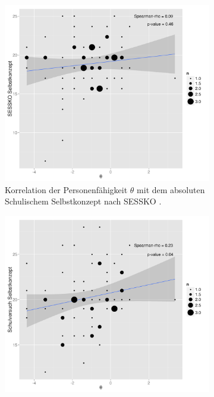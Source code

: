   \begin{figure}[htbp]
  \ContinuedFloat %
  \centering
  \begin{subfigure}{0.49\textwidth}
   \includegraphics[width=1.0\linewidth]{graphics/corPersonenSESSKO.png}
   \caption{Korrelation der Personenfähigkeit $\theta$ mit dem absoluten Schulischem Selbstkonzept nach SESSKO \citep{Schone2002}.}
   \label{fig:corPersonenSESSKO}
  \end{subfigure}
  \begin{subfigure}{0.49\textwidth}
    \includegraphics[width=1.0\linewidth]{graphics/corPersonenSelbskonzept.png}

\end{subfigure}
\end{figure}
